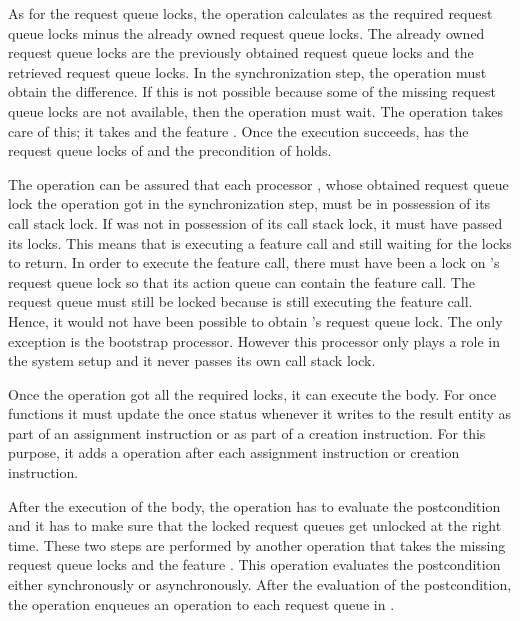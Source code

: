 As for the request queue locks, the operation calculates  as the required request queue locks minus the already owned request queue locks. The already owned request queue locks are the previously obtained request queue locks and the retrieved request queue locks. In the synchronization step, the operation must obtain the difference. If this is not possible because some of the missing request queue locks are not available, then the operation must wait. The  operation takes care of this; it takes  and the feature . Once the execution succeeds,  has the request queue locks of  and the precondition of  holds.

The  operation can be assured that each processor , whose obtained request queue lock the operation got in the synchronization step, must be in possession of its call stack lock. If  was not in possession of its call stack lock, it must have passed its locks. This means that  is executing a feature call and still waiting for the locks to return. In order to execute the feature call, there must have been a lock on 's request queue lock so that its action queue can contain the feature call. The request queue must still be locked because  is still executing the feature call. Hence, it would not have been possible to obtain 's request queue lock. The only exception is the bootstrap processor. However this processor only plays a role in the system setup and it never passes its own call stack lock.

Once the operation got all the required locks, it can execute the body. For once functions it must update the once status whenever it writes to the result entity as part of an assignment instruction or as part of a creation instruction. For this purpose, it adds a  operation after each assignment instruction or creation instruction.

After the execution of the body, the operation has to evaluate the postcondition and it has to make sure that the locked request queues get unlocked at the right time. These two steps are performed by another operation  that takes the missing request queue locks  and the feature . This operation evaluates the postcondition either synchronously or asynchronously. After the evaluation of the postcondition, the operation enqueues an  operation to each request queue in .

